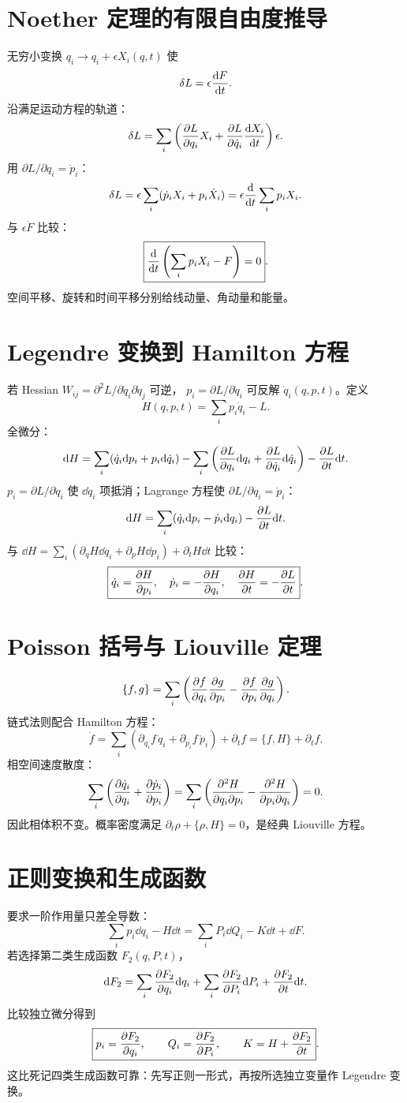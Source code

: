 \section{Noether 定理的有限自由度推导}
无穷小变换
$q_i\to q_i+\epsilon X_i(q,t)$ 使
\[
\delta L=\epsilon\frac{\mathrm d F}{\mathrm d t}.
\]
沿满足运动方程的轨道：
\[
\delta L=\sum_i\left(
\frac{\partial L}{\partial q_i}X_i+\frac{\partial L}{\partial \dot q_i}\frac{\mathrm d X_i}{\mathrm d t}\right)\epsilon.
\]
用
$\partial L/\partial q_i=\dot p_i$：
\[
\delta L=\epsilon\sum_i(\dot p_iX_i+p_i\dot X_i)
=\epsilon\frac{\mathrm d }{\mathrm d t}\sum_ip_iX_i.
\]
与 $\epsilon\dot F$ 比较：
\[
\boxed{\frac{\mathrm d }{\mathrm d t}\left(\sum_ip_iX_i-F\right)=0}.
\]
空间平移、旋转和时间平移分别给线动量、角动量和能量。

\section{Legendre 变换到 Hamilton 方程}
若 Hessian
$W_{ij}=\partial^2L/\partial\dot q_i\partial\dot q_j$ 可逆，
$p_i=\partial L/\partial\dot q_i$ 可反解 $\dot q_i(q,p,t)$。定义
\[
H(q,p,t)=\sum_ip_i\dot q_i-L.
\]
全微分：
\[
\mathrm d H=\sum_i(\dot q_i\mathrm d p_i+p_i\mathrm d\dot q_i)
-\sum_i\left(\frac{\partial L}{\partial q_i}\mathrm d q_i+
\frac{\partial L}{\partial \dot q_i}\mathrm d\dot q_i\right)-\frac{\partial L}{\partial t}\mathrm d t.
\]
$p_i=\partial L/\partial\dot q_i$ 使 $\dd\dot q_i$ 项抵消；Lagrange 方程使
$\partial L/\partial q_i=\dot p_i$：
\[
\mathrm d H=\sum_i(\dot q_i\mathrm d p_i-\dot p_i\mathrm d q_i)
-\frac{\partial L}{\partial t}\mathrm d t.
\]
与
$\dd H=\sum_i(\partial_qH\dd q_i+\partial_pH\dd p_i)+\partial_tH\dd t$
比较：
\[
\boxed{\dot q_i=\frac{\partial H}{\partial p_i},\quad
\dot p_i=-\frac{\partial H}{\partial q_i},\quad
\frac{\partial H}{\partial t}=-\frac{\partial L}{\partial t}}.
\]

\section{Poisson 括号与 Liouville 定理}
\[
\{f,g\}=\sum_i\left(
\frac{\partial f}{\partial q_i}\frac{\partial g}{\partial p_i}
-\frac{\partial f}{\partial p_i}\frac{\partial g}{\partial q_i}\right).
\]
链式法则配合 Hamilton 方程：
\[
\dot f=\sum_i(\partial_{q_i}f\,\dot q_i+
\partial_{p_i}f\,\dot p_i)+\partial_tf
=\{f,H\}+\partial_tf.
\]
相空间速度散度：
\[
\sum_i\left(
\frac{\partial \dot q_i}{\partial q_i}+\frac{\partial \dot p_i}{\partial p_i}\right)
=\sum_i\left(
\frac{\partial^2H}{\partial q_i\partial p_i}
-\frac{\partial^2H}{\partial p_i\partial q_i}\right)=0.
\]
因此相体积不变。概率密度满足
$\partial_t\rho+\{\rho,H\}=0$，是经典 Liouville 方程。

\section{正则变换和生成函数}
要求一阶作用量只差全导数：
\[
\sum_ip_i\dd q_i-H\dd t
=\sum_iP_i\dd Q_i-K\dd t+\dd F.
\]
若选择第二类生成函数 $F_2(q,P,t)$，
\[
\mathrm d F_2=\sum_i\frac{\partial F_2}{\partial q_i}\mathrm d q_i+
\sum_i\frac{\partial F_2}{\partial P_i}\mathrm d P_i+\frac{\partial F_2}{\partial t}\mathrm d t.
\]
比较独立微分得到
\[
\boxed{p_i=\frac{\partial F_2}{\partial q_i},\qquad
Q_i=\frac{\partial F_2}{\partial P_i},\qquad
K=H+\frac{\partial F_2}{\partial t}}.
\]
这比死记四类生成函数可靠：先写正则一形式，再按所选独立变量作 Legendre 变换。

